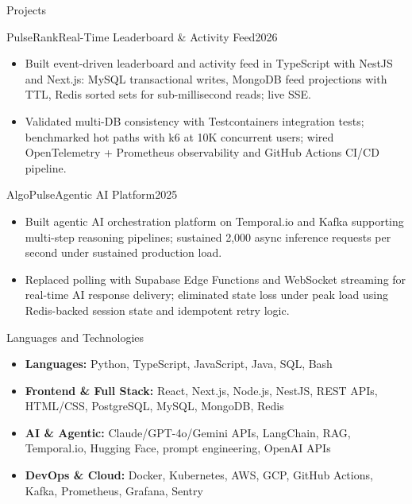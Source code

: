 \documentclass[]{mcdowellcv}
\begin{document}
\begin{cvsection}{Projects}
  \begin{cvsubsection}{PulseRank}{Real-Time Leaderboard \& Activity Feed}{2026}
    \begin{itemize}
      \item Built event-driven leaderboard and activity feed in TypeScript with NestJS and Next.js: MySQL transactional writes, MongoDB feed projections with TTL, Redis sorted sets for sub-millisecond reads; live SSE.
      \item Validated multi-DB consistency with Testcontainers integration tests; benchmarked hot paths with k6 at 10K concurrent users; wired OpenTelemetry + Prometheus observability and GitHub Actions CI/CD pipeline.
    \end{itemize}
    \vspace{-1.5pt}
  \end{cvsubsection}

  \begin{cvsubsection}{AlgoPulse}{Agentic AI Platform}{2025}
    \begin{itemize}
      \item Built agentic AI orchestration platform on Temporal.io and Kafka supporting multi-step reasoning pipelines; sustained 2,000 async inference requests per second under sustained production load.
      \item Replaced polling with Supabase Edge Functions and WebSocket streaming for real-time AI response delivery; eliminated state loss under peak load using Redis-backed session state and idempotent retry logic.
    \end{itemize}
  \end{cvsubsection}
\end{cvsection}

\begin{cvsection}{Languages and Technologies}
  \begin{cvsubsection}{}{}{}
    \begin{itemize}
      \item \textbf{Languages:} Python, TypeScript, JavaScript, Java, SQL, Bash
      \item \textbf{Frontend \& Full Stack:} React, Next.js, Node.js, NestJS, REST APIs, HTML/CSS, PostgreSQL, MySQL, MongoDB, Redis
      \item \textbf{AI \& Agentic:} Claude/GPT-4o/Gemini APIs, LangChain, RAG, Temporal.io, Hugging Face, prompt engineering, OpenAI APIs
      \item \textbf{DevOps \& Cloud:} Docker, Kubernetes, AWS, GCP, GitHub Actions, Kafka, Prometheus, Grafana, Sentry
    \end{itemize}
  \end{cvsubsection}
\end{cvsection}
\end{document}
